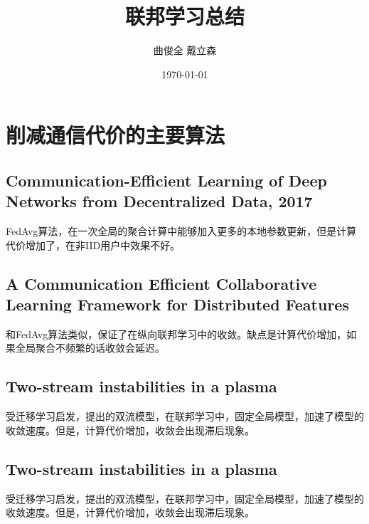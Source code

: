 \documentclass[12pt, a4paper]{article}
\title{
    联邦学习总结
}
\author{
    曲俊全 戴立森
}
\date{
    \today
}
\begin{document}
    \maketitle
    \section*{削减通信代价的主要算法}
        \subsection*{Communication-Efficient Learning of Deep Networks from Decentralized Data\cite{mcmahan2017communicationefficient}, 2017}
            FedAvg算法，在一次全局的聚合计算中能够加入更多的本地参数更新，但是计算代价增加了，在非IID用户中效果不好。
        \subsection*{A Communication Efficient Collaborative Learning Framework for Distributed Features\cite{liu2020communication}}
            和FedAvg算法类似，保证了在纵向联邦学习中的收敛。缺点是计算代价增加，如果全局聚合不频繁的话收敛会延迟。
        \subsection*{Two-stream instabilities in a plasma\cite{1965AuJPh..18..271K}}
            受迁移学习启发，提出的双流模型，在联邦学习中，固定全局模型，加速了模型的收敛速度。但是，计算代价增加，收敛会出现滞后现象。
        \subsection*{Two-stream instabilities in a plasma\cite{1965AuJPh..18..271K}}
            受迁移学习启发，提出的双流模型，在联邦学习中，固定全局模型，加速了模型的收敛速度。但是，计算代价增加，收敛会出现滞后现象。
\end{document}
